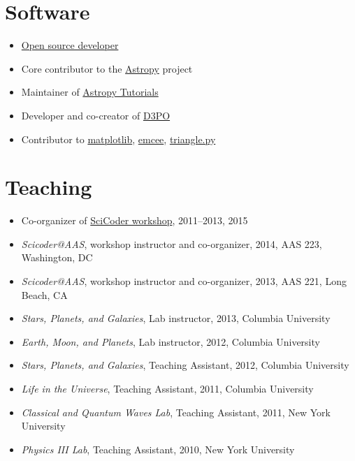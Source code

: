 \documentclass[12pt,letterpaper]{article}
\begin{document}
\section*{Software}
\begin{itemize}
	
	\item \href{https://github.com/adrn}{Open source developer}
	\item Core contributor to the \href{http://www.astropy.org/}{Astropy} project
	\item Maintainer of \href{http://tutorials.astropy.org/}{Astropy Tutorials}
	\item Developer and co-creator of \href{http://d3po.org}{D3PO}
	\item Contributor to \href{http://matplotlib.org/}{matplotlib}, \href{http://dan.iel.fm/emcee/current/}{emcee}, \href{https://github.com/dfm/triangle.py}{triangle.py}

\end{itemize}

\section*{Teaching}
\begin{itemize}
	
	\item Co-organizer of \href{http://scicoder.org}{SciCoder workshop}, 2011--2013, 2015
	\item \emph{Scicoder@AAS}, workshop instructor and co-organizer, 2014, AAS 223, Washington, DC
	\item \emph{Scicoder@AAS}, workshop instructor and co-organizer, 2013, AAS 221, Long Beach, CA
	\item \emph{Stars, Planets, and Galaxies}, Lab instructor, 2013, Columbia University
	\item \emph{Earth, Moon, and Planets}, Lab instructor, 2012, Columbia University
	\item \emph{Stars, Planets, and Galaxies}, Teaching Assistant, 2012, Columbia University
	\item \emph{Life in the Universe}, Teaching Assistant, 2011, Columbia University
	\item \emph{Classical and Quantum Waves Lab}, Teaching Assistant, 2011, New York University
	\item \emph{Physics III Lab}, Teaching Assistant, 2010, New York University

\end{itemize}
\end{document}
